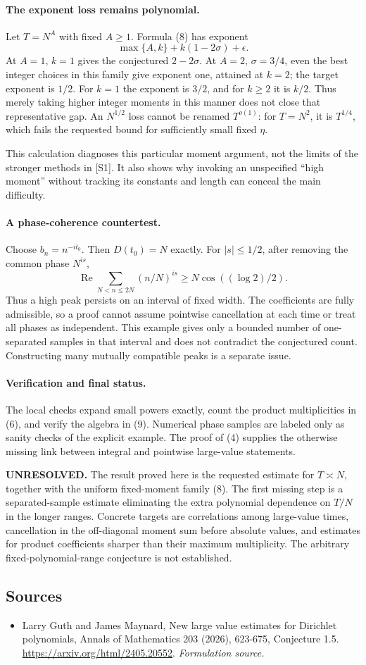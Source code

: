 \documentclass[11pt]{article}
\begin{document}
\paragraph{The exponent loss remains polynomial.}
Let $T=N^A$ with fixed $A\ge1$. Formula (8) has exponent
\[
                       \max\{A,k\}+k(1-2\sigma)+\epsilon.\tag{9}
\]
At $A=1$, $k=1$ gives the conjectured $2-2\sigma$.
At $A=2$, $\sigma=3/4$, even the best integer choices in this family
give exponent one, attained at $k=2$; the target exponent is $1/2$.
For $k=1$ the exponent is $3/2$, and for $k\ge2$ it is $k/2$.
Thus merely taking higher integer moments in this manner does not
close that representative gap. An $N^{1/2}$ loss cannot be renamed
$T^{o(1)}$: for $T=N^2$, it is $T^{1/4}$, which fails the requested
bound for sufficiently small fixed $\eta$.

This calculation diagnoses this particular moment argument, not the
limits of the stronger methods in [S1]. It also shows why invoking an
unspecified ``high moment'' without tracking its constants and length
can conceal the main difficulty.

\paragraph{A phase-coherence countertest.}
Choose $b_n=n^{-it_0}$. Then $D(t_0)=N$ exactly.
For $|s|\le1/2$, after removing the common phase $N^{is}$,
\[
 \operatorname{Re}\sum_{N<n\le2N}(n/N)^{is}
                         \ge N\cos((\log2)/2).
\]
Thus a high peak persists on an interval of fixed width.
The coefficients are fully admissible, so a proof cannot assume
pointwise cancellation at each time or treat all phases as independent.
This example gives only a bounded number of one-separated samples
in that interval and does not contradict the conjectured count.
Constructing many mutually compatible peaks is a separate issue.

\paragraph{Verification and final status.}
The local checks expand small powers exactly, count the product
multiplicities in (6), and verify the algebra in (9). Numerical phase
samples are labeled only as sanity checks of the explicit example.
The proof of (4) supplies the otherwise missing link between integral
and pointwise large-value statements.

\textbf{UNRESOLVED.} The result proved here is the requested estimate
for $T\asymp N$, together with the uniform fixed-moment family (8).
The first missing step is a separated-sample estimate eliminating the
extra polynomial dependence on $T/N$ in the longer ranges. Concrete
targets are correlations among large-value times, cancellation in the
off-diagonal moment sum before absolute values, and estimates for product
coefficients sharper than their maximum multiplicity. The arbitrary
fixed-polynomial-range conjecture is not established.

\subsection{Sources}
\begin{itemize}
\item[S1]Larry Guth and James Maynard, New large value estimates for Dirichlet polynomials, Annals of Mathematics 203 (2026), 623-675, Conjecture 1.5.
\url{https://arxiv.org/html/2405.20552}.
\textit{Formulation source.}
\end{itemize}
\end{document}
